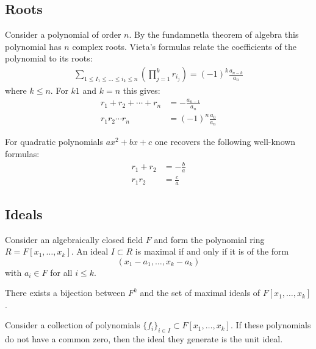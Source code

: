 \subsection{Roots}

	\begin{formula}[Vieta]
		Consider a polynomial of order $n$. By the fundamnetla theorem of algebra this polynomial has $n$ complex roots. Vieta's formulas relate the coefficients of the polynomial to its roots:
		\begin{gather}
			\sum_{1\leq I_1\leq...\leq i_k\leq n}\left(\prod_{j=1}^kr_{i_j}\right) = (-1)^k\frac{a_{n-k}}{a_n}
		\end{gather}
		where $k\leq n$. For $k1$ and $k=n$ this gives:
		\begin{align}
			r_1+r_2+\cdots+r_n &= -\frac{a_{n-1}}{a_n}\\
			r_1r_2\cdots r_n &= (-1)^n\frac{a_0}{a_n}
		\end{align}
	\end{formula}
	\begin{example}
		For quadratic polynomials $ax^2+bx+c$ one recovers the following well-known formulas:
		\begin{align}
			r_1+r_2 &= -\frac{b}{a}\\
			r_1r_2 &= \frac{c}{a}
		\end{align}
	\end{example}

\subsection{Ideals}

	\begin{theorem}
		Consider an algebraically closed field $F$ and form the polynomial ring $R=F[x_1, \ldots, x_k]$. An ideal $I\subset R$ is maximal if and only if it is of the form \[(x_1-a_1, \ldots, x_k-a_k)\] with $a_i\in F$ for all $i\leq k$.
	\end{theorem}
	\begin{result}
		There exists a bijection between $F^k$ and the set of maximal ideals of $F[x_1, \ldots, x_k]$.
	\end{result}
	\begin{result}
		Consider a collection of polynomials $\{f_i\}_{i\in I}\subset F[x_1, \ldots, x_k]$. If these polynomials do not have a common zero, then the ideal they generate is the unit ideal.
	\end{result}
	
